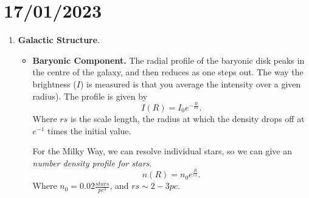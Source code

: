\documentclass[a4paper]{article}
\begin{document}
\section{17/01/2023}
\begin{enumerate}
	\item {\bf Galactic Structure}. 
		\begin{itemize}
			\item {\bf Baryonic Component.}
				The radial profile of the baryonic disk peaks in the centre of the galaxy, and then reduces as one steps out. The way the brightness ($I $) is measured is that you average the intensity over a given radius). The profile is given by \[
				I(R) = I_{0} e^{-\frac{R}{rs}}
				.\] Where $rs$ is the scale length, the radius at which the density drops off at $e^{-1}$ times the initial value.

				For the Milky Way, we can resolve individual stars, so we can give an {\it number density profile for stars}. \[
				n(R) = n_{0}e^{\frac{R}{rs}}
			.\] Where $n_{0} = 0.02 \frac{stars}{pc^{3}}$, and $rs\sim2-3pc$.
			


\end{itemize}
\end{enumerate}
\end{document}
